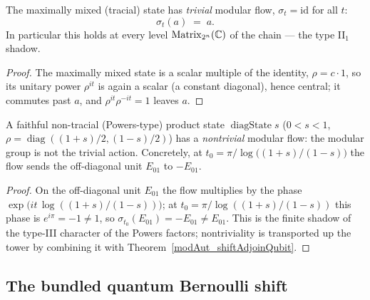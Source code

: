 \begin{theorem}\label{modAut_maximallyMixed_eq_id}
  \leanok
  The maximally mixed (tracial) state has \emph{trivial} modular flow, \(\sigma_t=\mathrm{id}\) for all
  \(t\):
  \[
    \sigma_t(a) \;=\; a.
  \]
  In particular this holds at every level \(\operatorname{Matrix}_{2^{n}}(\mathbb{C})\) of the chain --- the type II\(_1\)
  shadow.
\end{theorem}
\begin{proof}\leanok
  The maximally mixed state is a scalar multiple of the identity, \(\rho=c\cdot 1\), so its unitary
  power \(\rho^{it}\) is again a scalar (a constant diagonal), hence central; it commutes past \(a\),
  and \(\rho^{it}\rho^{-it}=1\) leaves \(a\).
\end{proof}

\begin{theorem}\label{modAut_diagState_ne_id}
  \leanok
  A faithful non-tracial (Powers-type) product state \(\operatorname{diagState} s\)
  (\(0<s<1\), \(\rho=\operatorname{diag}((1+s)/2,(1-s)/2)\)) has a \emph{nontrivial} modular flow: the
  modular group is not the trivial action. Concretely, at
  \(t_0=\pi/\log\bigl((1+s)/(1-s)\bigr)\) the flow sends the off-diagonal unit \(E_{01}\) to
  \(-E_{01}\).
\end{theorem}
\begin{proof}\leanok
  On the off-diagonal unit \(E_{01}\) the flow multiplies by the phase
  \(\exp\!\bigl(it\,\log((1+s)/(1-s))\bigr)\); at \(t_0=\pi/\log((1+s)/(1-s))\) this phase is
  \(e^{i\pi}=-1\ne 1\), so \(\sigma_{t_0}(E_{01})=-E_{01}\ne E_{01}\). This is the finite shadow of the
  type-III character of the Powers factors; nontriviality is transported up the tower by combining it
  with Theorem~\ref{modAut_shiftAdjoinQubit}.
\end{proof}

\subsection{The bundled quantum Bernoulli shift}

